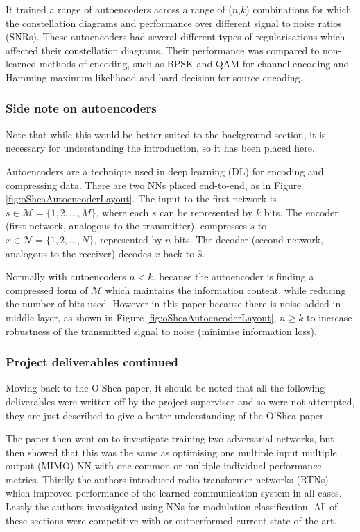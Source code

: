 \documentclass[12pt,onecolumn,letterpaper]{article}
\begin{document}
It trained a range of autoencoders across a range of ($n$,$k$) combinations for which the constellation diagrams and performance over different signal to noise ratios (SNRs). These autoencoders had several different types of regularisations which affected their constellation diagrams. Their performance was compared to non-learned methods of encoding, such as BPSK and QAM for channel encoding and Hamming maximum likelihood and hard decision for source encoding. 

\subsubsection{Side note on autoencoders}

Note that while this would be better suited to the background section, it is necessary for understanding the introduction, so it has been placed here.

Autoencoders are a technique used in deep learning (DL) for encoding and compressing data. There are two NNs placed end-to-end, as in Figure \ref{fig:oSheaAutoencoderLayout}. The input to the first network is $s \in \mathcal{M} = \{1,2,\dots,M\}$, where each $s$ can be represented by $k$ bits. The encoder (first network, analogous to the transmitter), compresses $s$ to $x \in \mathcal{N} = \{1,2,\dots,N\}$, represented by $n$ bits. The decoder (second network, analogous to the receiver) decodes $x$ back to $\hat{s}$.

Normally with autoencoders $n < k$, because the autoencoder is finding a compressed form of $\mathcal{M}$ which maintains the information content, while reducing the number of bits used. However in this paper because there is noise added in middle layer, as shown in Figure \ref{fig:oSheaAutoencoderLayout}, $n \geq k$ to increase robustness of the transmitted signal to noise (minimise information loss).

\subsubsection{Project deliverables continued}
\label{sec:deliverables}

Moving back to the O'Shea paper, it should be noted that all the following deliverables were written off by the project supervisor and so were not attempted, they are just described to give a better understanding of the O'Shea paper. 

The paper then went on to investigate training two adversarial networks, but then showed that this was the same as optimising one multiple input multiple output (MIMO) NN with one common or multiple individual performance metrics. Thirdly the authors introduced radio transformer networks (RTNs) which improved performance of the learned communication system in all cases. Lastly the authors investigated using NNs for modulation classification. All of these sections were competitive with or outperformed current state of the art. 
\end{document}
